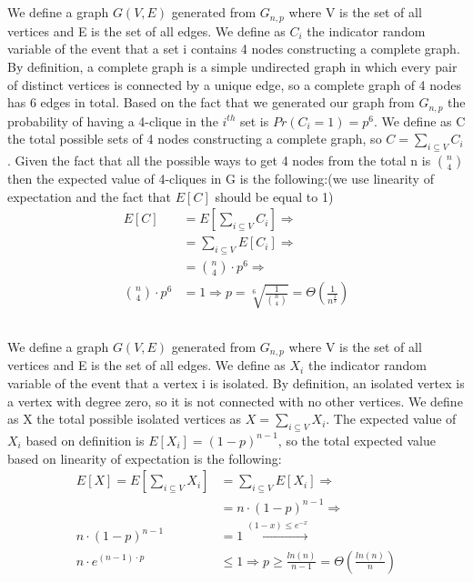 \documentclass[11pt]{537homework}
\begin{document}
\subsection{} 
We define a graph $G(V,E)$ generated from $G_{n,p}$ where V is the set of all vertices and E is the set of all edges. We define as $C_i$ the indicator random variable of the event that a set i contains 4 nodes constructing a complete graph. By definition, a complete graph is a simple undirected graph in which every pair of distinct vertices is connected by a unique edge, so a complete graph of 4 nodes has 6 edges in total. Based on the fact that we generated our graph from $G_{n,p}$ the probability of having a 4-clique in the $i^{th}$ set is $Pr(C_i = 1) = p^6$. We define as C the total possible sets of 4 nodes constructing a complete graph, so $C = \sum_{i \subseteq V}^{} C_i $. Given the fact that all the possible ways to get 4 nodes from the total n is ${n \choose 4}$ then the expected value of 4-cliques in G is the following:(we use linearity of expectation and the fact that $E[C]$ should be equal to 1)
\begin{align*}
    E[C] &= E[\sum_{i \subseteq V}^{} C_i] \Longrightarrow \\
         &= \sum_{i \subseteq V}^{} E[C_i] \Longrightarrow \\
         &={n \choose 4} \cdot p^6 \Longrightarrow \\
         {n \choose 4} \cdot p^6 &= 1 \Longrightarrow
         p = \sqrt[6]{\frac{1}{{n \choose 4}}} = \Theta(\frac{1}{n^{\frac{2}{3}}})
\end{align*}
\subsection{} 
We define a graph $G(V,E)$ generated from $G_{n,p}$ where V is the set of all vertices and E is the set of all edges. We define as $X_i$ the indicator random variable of the event that a vertex i is isolated. By definition, an isolated vertex is a vertex with degree zero, so it is not connected with no other vertices. We define as X the total possible isolated vertices as $X = \sum_{i \subseteq V}^{} X_i$. The expected value of $X_i$ based on definition is $E[X_i]= (1-p)^{n-1}$, so the total expected value based on linearity of expectation is the following: 
\begin{align*}
    E[X] = E[\sum_{i \subseteq V}^{} X_i] &= \sum_{i \subseteq V}^{} E[X_i] \Longrightarrow \\
         &=n \cdot (1-p)^{n-1} \Longrightarrow \\
         n \cdot (1-p)^{n-1}  &= 1 \xrightarrow{(1-x)\leq e^{-x}} \\
         n \cdot e^{(n-1) \cdot p} &\leq 1 \Longrightarrow p \geq \frac{ln(n)}{n-1} = \Theta(\frac{ln(n)}{n}) 
\end{align*}
\end{document}
